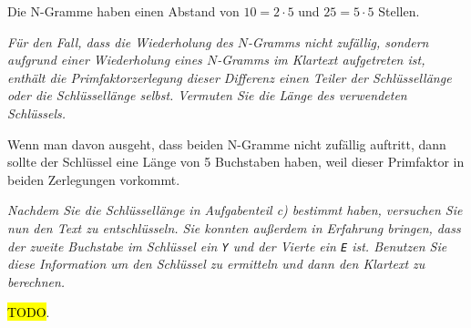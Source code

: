 \documentclass[
  ngerman,
  DIV=12
]{scrartcl}
\begin{document}
\medskip\noindent
Die N-Gramme haben einen Abstand von $10 = 2 \cdot 5$ und $25 = 5 \cdot 5$ Stellen. 

\bigskip\noindent
\emph{Für den Fall, dass die Wiederholung des $N$-Gramms nicht zufällig, sondern aufgrund einer Wiederholung eines $N$-Gramms im Klartext aufgetreten ist, enthält die Primfaktorzerlegung dieser Differenz einen Teiler der Schlüssellänge oder die Schlüssellänge selbst. Vermuten Sie die Länge des verwendeten Schlüssels.}

\medskip\noindent
Wenn man davon ausgeht, dass beiden N-Gramme nicht zufällig auftritt, dann sollte der Schlüssel eine Länge von 5 Buchstaben haben, weil dieser Primfaktor in beiden Zerlegungen vorkommt.

\bigskip\noindent
\emph{Nachdem Sie die Schlüssellänge in Aufgabenteil c) bestimmt haben, versuchen Sie nun den Text zu entschlüsseln. Sie konnten außerdem in Erfahrung bringen, dass der zweite Buchstabe im Schlüssel ein \texttt{Y} und der Vierte ein \texttt{E} ist. Benutzen Sie diese Information um den Schlüssel zu ermitteln und dann den Klartext zu berechnen.}

\medskip\noindent
\hl{TODO}.
\end{document}
